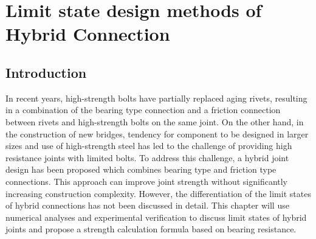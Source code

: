 \chapter{Limit state design methods of Hybrid Connection}
\label{ch7}

\begin{spacing}{1.25} %
\minitoc %
\end{spacing} %
\onehalfspacing %



\section{Introduction}

In recent years, high-strength bolts have partially replaced aging rivets, resulting in a combination of the bearing type connection and a friction connection between rivets and high-strength bolts on the same joint. On the other hand, in the construction of new bridges, tendency for component to be designed in larger sizes and use of high-strength steel has led to the challenge of providing high resistance joints with limited bolts. To address this challenge, a hybrid joint design has been proposed which combines bearing type and friction type connections. This approach can improve joint strength without significantly increasing construction complexity. However, the differentiation of the limit states of hybrid connections has not been discussed in detail. This chapter will use numerical analyses and experimental verification to discuss limit states of hybrid joints and propose a strength calculation formula based on bearing resistance.


